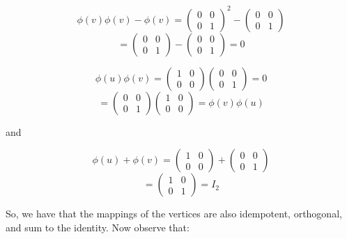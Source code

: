 \begin{solution}
    $$\phi(v)\phi(v)-\phi(v)=\left(\begin{array}{cc} 0 & 0 \\ 0 & 1 \end{array}\right)^2-
    \left(\begin{array}{cc} 0 & 0 \\ 0 & 1 \end{array}\right)$$
    $$=\left(\begin{array}{cc} 0 & 0 \\ 0 & 1 \end{array}\right)-
    \left(\begin{array}{cc} 0 & 0 \\ 0 & 1 \end{array}\right)=0$$

    $$\phi(u)\phi(v)=\left(\begin{array}{cc} 1 & 0 \\ 0 & 0 \end{array}\right)
    \left(\begin{array}{cc} 0 & 0 \\ 0 & 1 \end{array}\right)=0$$
    $$=\left(\begin{array}{cc} 0 & 0 \\ 0 & 1 \end{array}\right)
    \left(\begin{array}{cc} 1 & 0 \\ 0 & 0 \end{array}\right)=\phi(v)\phi(u)$$

    and

    $$\phi(u)+\phi(v)=\left(\begin{array}{cc} 1 & 0 \\ 0 & 0 \end{array}\right)+
    \left(\begin{array}{cc} 0 & 0 \\ 0 & 1 \end{array}\right)$$
    $$=\left(\begin{array}{cc} 1 & 0 \\ 0 & 1 \end{array}\right)=I_2$$

    So, we have that the mappings of the vertices are also idempotent, orthogonal, and sum to the
    identity. Now observe that:


\end{solution}
